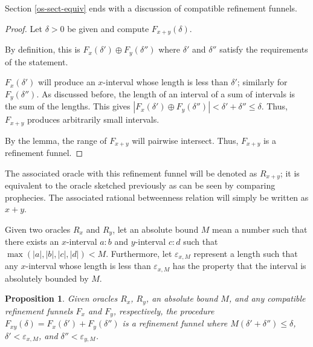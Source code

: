 \documentclass[12pt]{article}
\newtheorem{proposition}{Proposition}[section]
\begin{document}
Section \ref{os-sect-equiv} ends with a discussion of compatible refinement funnels. 

\begin{proof}

    Let $\delta > 0$ be given and compute $F_{x+y}(\delta)$. 

    By definition, this is $F_x(\delta') \oplus F_y(\delta'')$ where $\delta'$ and $\delta''$ satisfy the requirements of the statement. 

    $F_x( \delta')$ will produce an $x$-interval whose length is less than $\delta'$; similarly for $F_y(\delta'')$. As discussed before, the length of an interval of a sum of intervals is the sum of the lengths. This gives $|F_x(\delta') \oplus F_y(\delta'')| < \delta'+\delta'' \leq \delta$. Thus, $F_{x+y}$ produces arbitrarily small intervals. 
         
    By the lemma, the range of $F_{x+y}$ will pairwise intersect. Thus, $F_{x+y}$ is a refinement funnel. 
    
\end{proof}


The associated oracle with this refinement funnel will be denoted as $R_{x + y}$; it is equivalent to the oracle sketched previously as can be seen by comparing prophecies. The associated rational betweenness relation will simply be written as $x+y$. 

Given two oracles $R_x$ and $R_y$, let an absolute bound $M$ mean a number such that there exists an $x$-interval $a:b$ and $y$-interval $c:d$ such that $\max(|a|, |b|, |c|, |d|)  < M$. Furthermore, let $\varepsilon_{x,M}$ represent a length such that any $x$-interval whose length is less than $\varepsilon_{x, M}$ has the property that the interval is absolutely bounded by $M$.  

\begin{proposition}
    Given oracles $R_x$, $R_y$, an absolute bound $M$, and any compatible refinement funnels $F_{x}$ and $F_{y}$, respectively, the procedure $F_{xy} (\delta) = F_x(\delta') + F_y(\delta'')$ is a refinement funnel where $M(\delta' + \delta'') \leq \delta$, $\delta' < \varepsilon_{x, M}$, and $\delta'' < \varepsilon_{y,M}$. 
\end{proposition}
\end{document}

